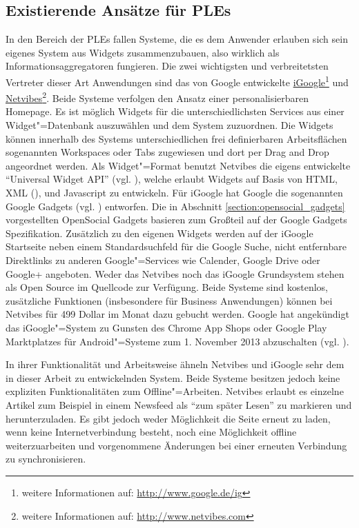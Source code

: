 \subsection{Existierende Ansätze für \acp{PLE}}
In den Bereich der \acp{PLE} fallen Systeme, die es dem Anwender erlauben sich sein eigenes System aus Widgets zusammenzubauen, also wirklich als Informationsaggregatoren fungieren. Die zwei wichtigsten und verbreitetsten Vertreter dieser Art Anwendungen sind das von Google entwickelte \href{http://www.google.de/ig}{iGoogle}\footnote{weitere Informationen auf: \url{http://www.google.de/ig}} und \href{http://www.netvibes.com}{Netvibes}\footnote{weitere Informationen auf: \url{http://www.netvibes.com}}. Beide Systeme verfolgen den Ansatz einer personalisierbaren Homepage. Es ist möglich Widgets für die unterschiedlichsten Services aus einer Widget"=Datenbank auszuwählen und dem System zuzuordnen. Die Widgets können innerhalb des Systems unterschiedlichen frei definierbaren Arbeitsflächen sogenannten Workspaces oder Tabs zugewiesen und dort per Drag and Drop angeordnet werden. Als Widget"=Format benutzt Netvibes die eigens entwickelte "`Universal Widget API"' (vgl. \cite{UWAJSRuntime2012}), welche erlaubt Widgets auf Basis von \ac{HTML}, \acs{XML} (), und Javascript zu entwickeln. Für iGoogle hat Google die sogenannten Google Gadgets (vgl. \cite{GoogleGadgetsApi2012}) entworfen. Die in Abschnitt \ref{section:opensocial_gadgets} vorgestellten OpenSocial Gadgets basieren zum Großteil auf der Google Gadgets Spezifikation. Zusätzlich zu den eigenen Widgets werden auf der iGoogle Startseite neben einem Standardsuchfeld für die Google Suche, nicht entfernbare Direktlinks zu anderen Google"=Services wie Calender, Google Drive oder Google+ angeboten. Weder das Netvibes noch das iGoogle Grundsystem stehen als Open Source im Quellcode zur Verfügung. Beide Systeme sind kostenlos, zusätzliche Funktionen (insbesondere für Business Anwendungen) können bei Netvibes für 499 Dollar im Monat dazu gebucht werden. Google hat angekündigt das iGoogle"=System zu Gunsten des Chrome App Shops oder Google Play Marktplatzes für Android"=Systeme zum 1. November 2013 abzuschalten (vgl. \cite{Google2012}).

In ihrer Funktionalität und Arbeitsweise ähneln Netvibes und iGoogle sehr dem in dieser Arbeit zu entwickelnden System. Beide Systeme besitzen jedoch keine expliziten Funktionalitäten zum Offline"=Arbeiten. Netvibes erlaubt es einzelne Artikel zum Beispiel in einem Newsfeed als "`zum später Lesen"' zu markieren und herunterzuladen. Es gibt jedoch weder Möglichkeit die Seite erneut zu laden, wenn keine Internetverbindung besteht, noch eine Möglichkeit offline weiterzuarbeiten und vorgenommene Änderungen bei einer erneuten Verbindung zu synchronisieren. 

